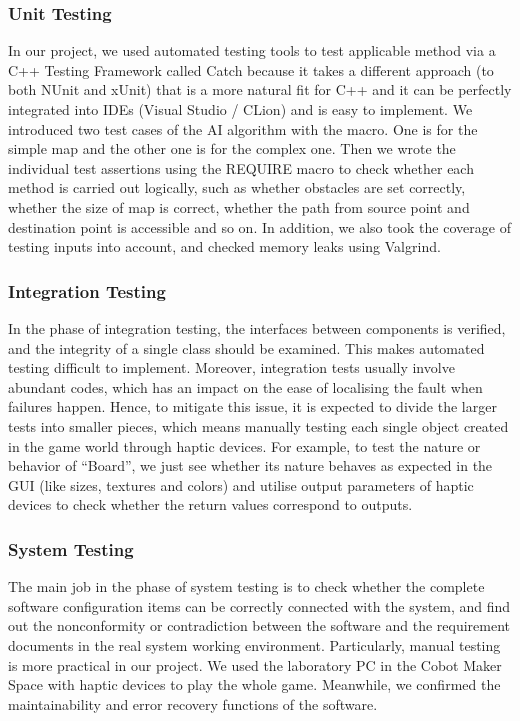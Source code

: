 \documentclass[a4paper]{article}
\begin{document}
\subsubsection{Unit Testing}
In our project, we used automated testing tools to test applicable method via a C++ Testing Framework called Catch because it takes a different approach (to both NUnit and xUnit) that is a more natural fit for C++ and it can be perfectly integrated into IDEs (Visual Studio / CLion) and is easy to implement. We introduced two test cases of the AI algorithm with the macro. One is for the simple map and the other one is for the complex one. Then we wrote the individual test assertions using the REQUIRE macro to check whether each method is carried out logically, such as whether obstacles are set correctly, whether the size of map is correct, whether the path from source point and destination point is accessible and so on. In addition, we also took the coverage of testing inputs into account, and checked memory leaks using Valgrind.

\subsubsection{Integration Testing}
In the phase of integration testing, the interfaces between components is verified, and the integrity of a single class should be examined. This makes automated testing difficult to implement. Moreover, integration tests usually involve abundant codes, which has an impact on the ease of localising the fault when failures happen. Hence, to mitigate this issue, it is expected to divide the larger tests into smaller pieces, which means manually testing each single object created in the game world through haptic devices. For example, to test the nature or behavior of “Board”, we just see whether its nature behaves as expected in the GUI (like sizes, textures and colors) and utilise output parameters of haptic devices to check whether the return values correspond to outputs.

\subsubsection{System Testing}
The main job in the phase of system testing is to check whether the complete software configuration items can be correctly connected with the system, and find out the nonconformity or contradiction between the software and the requirement documents in the real system working environment. Particularly, manual testing is more practical in our project. We used the laboratory PC in the Cobot Maker Space with haptic devices to play the whole game. Meanwhile, we confirmed the maintainability and error recovery functions of the software.
\end{document}
